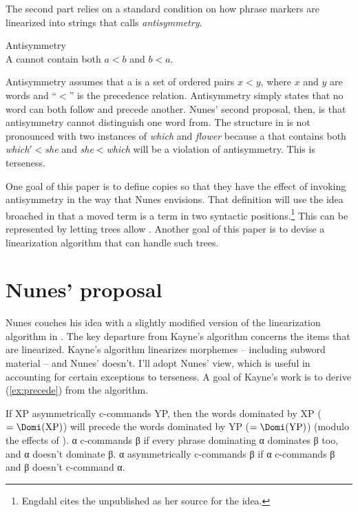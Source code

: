 \documentclass[output=paper]{langsci/langscibook}
\begin{document}
The second part relies on a standard condition on how phrase markers are
linearized into strings that \cite{Kayne1994} calls \emph{antisymmetry}.

\begin{exe}
	\ex \label{ex:antisymm} Antisymmetry\\
	A  cannot contain both $a<b$ and $b<a$.
\end{exe}

Antisymmetry assumes that a  is a set of ordered pairs $x<y$,
where $x$ and $y$ are words and ``$<$'' is the precedence relation. Antisymmetry
simply states that no word can both follow and precede another. Nunes' second
proposal, then, is that antisymmetry cannot distinguish one word from.
The structure in  is not pronounced with two instances of \emph{which} and
\emph{flower} because a  that contains both
\emph{which$'$}$<$\emph{she} and \emph{she}$<$\emph{which} will be a violation of
antisymmetry. This is terseness.

One goal of this paper is to define copies so that they have the effect of
invoking antisymmetry in the way that Nunes envisions. That definition will use
the idea broached in \cite{Engdahl1980} that a moved term is a term in two
syntactic positions.\footnote{Engdahl cites the unpublished \citet{PetRit1981}
as her source for the idea.} This can be represented by letting 
trees allow . Another goal of this paper is to devise a
linearization algorithm that can handle such trees.

\section{Nunes' proposal} %
\label{sec:nunesproposal}

Nunes couches his idea with a slightly modified version of the linearization
algorithm in \cite{Kayne1994}. The key departure from Kayne's algorithm
concerns the items that are linearized. Kayne's algorithm linearizes morphemes
-- including subword material -- and Nunes' doesn't. I'll adopt Nunes' view,
which is useful in accounting for certain exceptions to terseness. A goal of
Kayne's work is to derive (\ref{ex:precede}) from the  algorithm.
\begin{exe}
	\ex \label{ex:precede}
    If XP asymmetrically c-commands YP, then the words dominated by XP ($=\Domi(\text{XP})$)
    will precede the words dominated by YP ($=\Domi(\text{YP})$) (modulo the effects of
    ).
    \ex α c-commands β if every phrase dominating α dominates β too, and α
    doesn't dominate β. α asymmetrically c-commands β if α c-commands β and β
    doesn't c-command α.
\end{exe}
\end{document}
